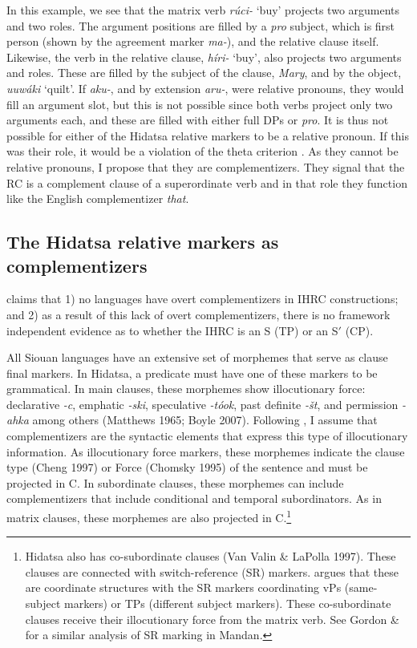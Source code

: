 \documentclass[output=paper]{LSP/langsci}
\begin{document}
In this example, we see that the matrix verb \textit{r\'uci-} `buy' projects two arguments and two  roles. The argument positions are filled by a \textit{pro} subject, which is first person (shown by the agreement marker \textit{ma-}), and the relative clause itself. Likewise, the verb in the relative clause, \textit{h\'iri-} `buy', also projects two arguments and  roles. These are filled by the subject of the clause, \textit{Mary}, and by the object, \textit{uuw\'aki} `quilt'. If \textit{aku-}, and by extension \textit{aru-}, were relative pronouns, they would fill an argument slot, but this is not possible since both verbs project only two arguments each, and these are filled with either full DPs or \textit{pro}. It is thus not possible for either of the Hidatsa relative markers to be a relative pronoun. If this was their role, it would be a violation of the theta criterion \citep[36]{Chomsky1981}. As they cannot be relative pronouns, I propose that they are complementizers. They signal that the RC is a complement clause of a superordinate verb and in that role they function like the English complementizer \textit{that}. 

\subsection{The Hidatsa relative markers as complementizers}

\citet{Culy1990} claims that 1) no languages have overt complementizers in IHRC constructions; and 2) as a result of this lack of overt complementizers, there is no framework independent evidence as to whether the IHRC is an S (TP) or an S$'$ (CP).  

	All Siouan languages have an extensive set of morphemes that serve as clause final markers. In Hidatsa, a predicate must have one of these markers to be grammatical. In main clauses, these morphemes show illocutionary force: declarative \textit{-c}, emphatic \textit{-ski}, speculative \textit{-t\'ook}, past definite \textit{-\v{s}t}, and permission \textit{-ahka} among others (Matthews 1965; Boyle 2007). Following \citet{Rizzi1997}, I assume that complementizers are the syntactic elements that express this type of illocutionary information. As illocutionary force markers, these morphemes indicate the clause type (Cheng 1997) or Force (Chomsky 1995) of the sentence and must be projected in C. In subordinate clauses, these morphemes can include complementizers that include conditional and temporal subordinators. As in matrix clauses, these morphemes are also projected in C.\footnote{Hidatsa also has co-subordinate clauses (Van Valin \& LaPolla 1997). These clauses are connected with switch-reference (SR) markers. \citet{Boyle2007} argues that these are coordinate structures with the SR markers coordinating vPs (same-subject markers) or TPs (different subject markers). These co-subordinate clauses receive their illocutionary force from the matrix verb. See Gordon \& \citet{Torres2012} for a similar analysis of SR marking in Mandan.}
	
\end{document}
